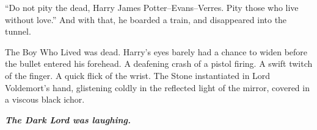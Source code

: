 “Do not pity the dead, Harry James Potter\mbox{--}Evans\mbox{--}Verres. Pity those who live without love.” And with that, he boarded a train, and disappeared into the tunnel.
\simpleline
\pagebreak
{}

\begin{flushright}
The Boy Who Lived was dead.
\SomeVSpace
Harry’s eyes barely had a chance to widen before the bullet entered his forehead.
\SmallVSpace
A deafening crash of a pistol firing.
\SmallVSpace
A swift twitch of the finger.
\SmallVSpace
A quick flick of the wrist.
\SmallVSpace
The Stone instantiated in Lord Voldemort’s hand, glistening coldly in the reflected light of the mirror, covered in a viscous black ichor.
\end{flushright}
\simpleline

\textbf{\textit{The Dark Lord was laughing.}}